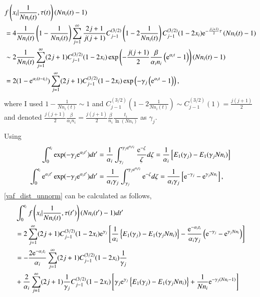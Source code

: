 \documentclass{article}
\begin{document}
\begin{align}
 & f\left(x_i| \frac{1}{Nn_i(t)}, \tau(t)\right) (Nn_i(t)-1)\\
 & = 4\frac{1}{Nn_i(t)}\left(1-\frac{1}{Nn_i(t)}\right) \sum_{j=1}^{\infty} \frac{2j+1}{j(j+1)} C^{(3/2)}_{j-1} \left(1-2\frac{1}{Nn_i(t)}\right) C^{(3/2)}_{j-1} (1-2x_i) \mathrm{e}^{-\frac{j(j+1)}{2}\tau} \left(Nn_i(t) - 1 \right)\\
 & \sim 2\frac{1}{Nn_i(t)} \sum_{j=1}^{\infty} (2j+1) C^{(3/2)}_{j-1} (1-2x_i) \exp \left( -\frac{j(j+1)}{2} \frac{\beta}{\alpha_i n_i}\left(\mathrm{e}^{\alpha_i t} - 1\right) \right) \left(Nn_i(t) - 1 \right)\\
 & = 2(1-\mathrm{e}^{\alpha_i(t - t_i)}) \sum_{j=1}^{\infty} (2j+1) C^{(3/2)}_{j-1} (1-2x_i) \exp \left(-\gamma_j \left(\mathrm{e}^{\alpha_i t} - 1\right)\right),
\end{align}
where I used $1 - \frac{1}{Nn_i(t)} \sim 1$ and $C^{(3/2)}_{j-1} \left(1-2\frac{1}{Nn_i(t)}\right) \sim C^{(3/2)}_{j-1} (1) = \frac{j(j+1)}{2}$ and denoted $\frac{j(j+1)}{2} \frac{\beta}{\alpha_i n_i} = \frac{j(j+1)}{2} \frac{\beta}{n_i} \frac{t_i}{\ln (Nn_i)}$ as $\gamma_j$.

Using
\begin{align}
 \int_{0}^{t_i} \exp(-\gamma_j \mathrm{e}^{\alpha_i t'}) dt' & = \frac{1}{\alpha_i} \int_{\gamma_j}^{\gamma_j \mathrm{e}^{\alpha_i t_i}} \frac{\mathrm{e}^{-\zeta}}{\zeta} d\zeta = \frac{1}{\alpha_i} \left[ E_1(\gamma_j) - E_1(\gamma_j Nn_i) \right]\\
 \int_{0}^{t_i} \mathrm{e}^{\alpha_i t'} \exp(-\gamma_j \mathrm{e}^{\alpha_i t'}) dt' & = \frac{1}{\alpha_i \gamma_j} \int_{\gamma_j}^{\gamma_j \mathrm{e}^{\alpha_i t_i}} \mathrm{e}^{-\zeta} d\zeta = \frac{1}{\alpha_i \gamma_j} \left[ \mathrm{e}^{-\gamma_j} - \mathrm{e}^{\gamma_j Nn_i} \right],
\end{align}
\eqref{vaf_dist_unnorm} can be calculated as follows,
\begin{align}
 & \int_{0}^{t_i} f\left(x_i| \frac{1}{Nn_i(t)}, \tau(t')\right) (Nn_i(t')-1)  dt'\\
 & = 2 \sum_{j=1}^{\infty} (2j + 1) C^{(3/2)}_{j-1} (1-2x_i) \mathrm{e}^{\gamma_j} \left[ \frac{1}{\alpha_i} \left\{ E_1(\gamma_j) - E_1(\gamma_j Nn_i) \right\} - \frac{\mathrm{e}^{-\alpha_i t_i}}{\alpha_i \gamma_j} \left( \mathrm{e}^{-\gamma_j} - \mathrm{e}^{\gamma_j Nn_i} \right) \right]\\
 & = - \frac{2\mathrm{e}^{-\alpha_i t_i}}{\alpha_i} \sum_{j=1}^{\infty} (2j+1) C^{(3/2)}_{j-1} (1-2x_i) \frac{1}{\gamma_j}\nonumber\\
 & + \frac{2}{\alpha_i} \sum_{j=1}^{\infty} (2j + 1) \frac{1}{\gamma_j} C^{(3/2)}_{j-1} (1-2x_i) \left[ \gamma_j \mathrm{e}^{\gamma_j} \left\{ E_1(\gamma_j) - E_1(\gamma_j Nn_i) \right\} + \frac{1}{Nn_i} \mathrm{e}^{-\gamma_j (Nn_i - 1)} \right]\label{vaf_dist_unnorm_term}
\end{align}
\end{document}
